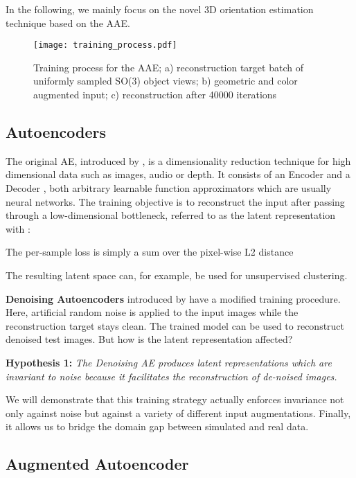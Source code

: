 In the following, we mainly focus on the novel 3D orientation estimation technique based on the AAE.
\begin{figure*}[t]\centering
	\captionsetup{width=0.9\textwidth}
	\texttt{[image: training\_process.pdf]}
	\caption{Training process for the \gls{AAE}; a) reconstruction target batch  of uniformly sampled SO(3) object views; b) geometric and color augmented input; c) reconstruction  after 40000 iterations}
	\label{fig:training_process}
\end{figure*}
\subsection{Autoencoders}

The original \gls{AE}, introduced by \cite{rumelhart1985learning}, is a dimensionality reduction technique for high dimensional data such as images, audio or depth. It consists of an Encoder  and a Decoder , both arbitrary learnable function approximators which are usually neural networks. The training objective is to reconstruct the input  after passing through a low-dimensional bottleneck, referred to as the latent representation  with  :

The per-sample loss is simply a sum over the pixel-wise L2 distance

The resulting latent space can, for example, be used for unsupervised clustering.

\textbf{Denoising Autoencoders} introduced by \cite{vincent2010stacked} have a modified training procedure. Here, artificial random noise is applied to the input images  while the reconstruction target stays clean. The trained model can be used to reconstruct denoised test images. But how is the latent representation affected? 

\textbf{Hypothesis 1:} \textit{The Denoising AE produces latent representations which are invariant to noise because it facilitates the reconstruction of de-noised images.}

We will demonstrate that this training strategy actually enforces invariance not only against noise but against a variety of different input augmentations. Finally, it allows us to bridge the domain gap between simulated and real data.

\subsection{Augmented Autoencoder}
\label{sec:aae}

